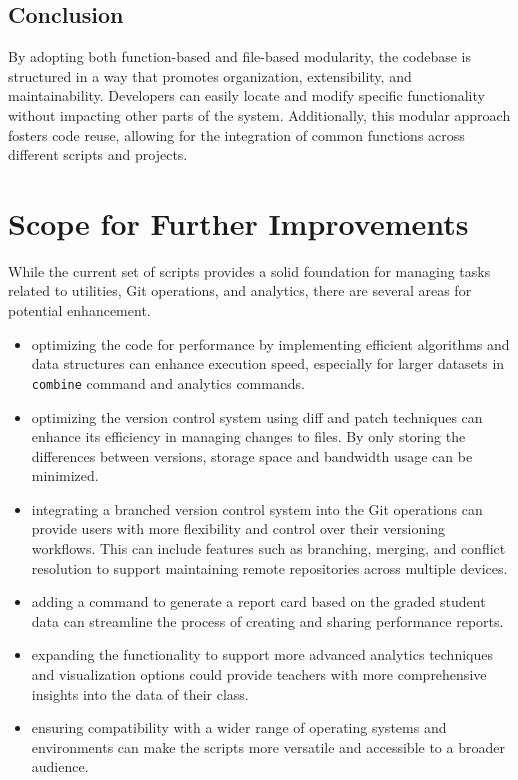 \documentclass{article}
\begin{document}
\subsection{Conclusion}

By adopting both function-based and file-based modularity, the codebase is structured in a way that promotes organization, extensibility, and maintainability. Developers can easily locate and modify specific functionality without impacting other parts of the system. Additionally, this modular approach fosters code reuse, allowing for the integration of common functions across different scripts and projects.

\section{Scope for Further Improvements}

While the current set of scripts provides a solid foundation for managing tasks related to utilities, Git operations, and analytics, there are several areas for potential enhancement. 
\begin{itemize}
    \item optimizing the code for performance by implementing efficient algorithms and data structures can enhance execution speed, especially for larger datasets in \texttt{combine} command and analytics commands.

    \item optimizing the version control system using diff and patch techniques can enhance its efficiency in managing changes to files. By only storing the differences between versions, storage space and bandwidth usage can be minimized.
    
    \item integrating a branched version control system into the Git operations can provide users with more flexibility and control over their versioning workflows. This can include features such as branching, merging, and conflict resolution to support maintaining remote repositories across multiple devices.

    \item adding a command to generate a report card based on the graded student data can streamline the process of creating and sharing performance reports.

    \item expanding the functionality to support more advanced analytics techniques and visualization options could provide teachers with more comprehensive insights into the data of their class.
    
    \item ensuring compatibility with a wider range of operating systems and environments can make the scripts more versatile and accessible to a broader audience.
    
\end{itemize}
\end{document}
